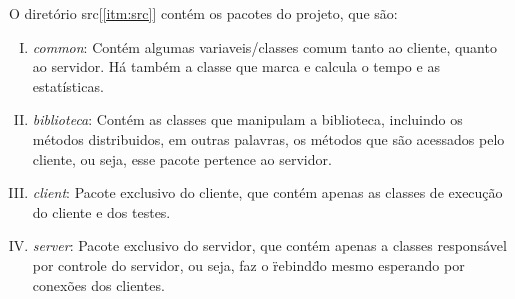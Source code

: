 \documentclass[a4paper,10pt]{article}
\begin{document}
O diretório src[\ref{itm:src}] contém os pacotes do projeto, que são:
\begin{enumerate}[I.] 
  \label{sec:packs}
\item \label{itm:common} \emph{common}: Contém algumas variaveis/classes comum tanto ao cliente, quanto ao servidor. Há também a classe que marca e calcula o tempo
  e as estatísticas.
\item \label{itm:biblioteca} \emph{biblioteca}: Contém as classes que manipulam a biblioteca, incluindo os métodos distribuidos, em outras palavras, os métodos que são
  acessados pelo cliente, ou seja, esse pacote pertence ao servidor.
\item \label{itm:client} \emph{client}: Pacote exclusivo do cliente, que contém apenas as classes de execução do cliente e dos testes.
\item \label{itm:server} \emph{server}: Pacote exclusivo do servidor, que contém apenas a classes responsável por controle do servidor, ou seja,
  faz o \"rebind\" do mesmo esperando por conexões dos clientes.
\end{enumerate}
\end{document}
